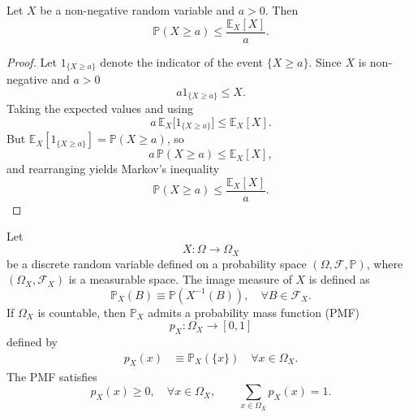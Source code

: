 \begin{theorem}
Let $X$ be a non-negative random variable and $a > 0$. Then
\begin{equation}
\mathbb{P}(X \geq a) \leq \frac{\mathbb{E}_X[X]}{a}.
\end{equation}
\end{theorem}
\begin{proof}
	Let $1_{\{X\ge a\}}$ denote the indicator of the event $\{X\ge a\}$. Since $X$ is non-negative and $a>0$
	\begin{equation}
		a1_{\{X\ge a\}} \le X.
	\end{equation}
	Taking the expected values and using 
	\begin{equation}
		a\,\mathbb{E}_X\big[1_{\{X\ge a\}}\big] \le \mathbb{E}_X[X].
	\end{equation}
	But $\mathbb{E}_X[1_{\{X\ge a\}}]=\mathbb{P}(X\ge a)$, so
	\begin{equation}
		a\,\mathbb{P}(X\ge a) \le \mathbb{E}_X[X],
	\end{equation}
	and rearranging yields Markov's inequality
	\begin{equation}
		\mathbb{P}(X\ge a) \le \frac{\mathbb{E}_X[X]}{a}.
	\end{equation}
\end{proof}

\begin{definition}
	\label{def:pmf}
	Let
	\begin{equation}
		X : \Omega \to \Omega_X
	\end{equation}
	be a discrete random variable defined on a probability space $(\Omega, \mathcal{F}, \mathbb{P})$, where $(\Omega_X, \mathcal{F}_X)$ is a measurable space. The image measure of $X$ is defined as
	\begin{equation}
		\mathbb{P}_X(B) \equiv \mathbb{P}(X^{-1}(B)), \quad \forall B \in \mathcal{F}_X.
	\end{equation}
	If $\Omega_X$ is countable, then $\mathbb{P}_X$ admits a probability mass function (PMF) 
	\begin{equation}
		p_X : \Omega_X \to [0,1]
	\end{equation} 
	defined by
	\begin{equation}
		\begin{split}
			p_X(x) &\equiv \mathbb{P}_X(\{x\}) \quad \forall x \in \Omega_X.
		\end{split}
	\end{equation}
	The PMF satisfies
	\begin{equation}
		p_X(x) \ge 0, \quad \forall x \in \Omega_X, 
		\qquad 
		\sum_{x \in \Omega_X} p_X(x) = 1.
	\end{equation}
\end{definition}


